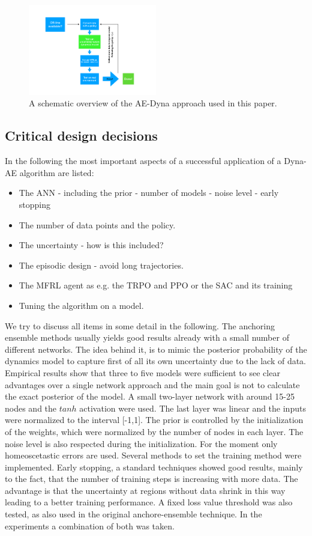 \documentclass[
 reprint,
 amsmath,amssymb,amsfonts,clevref,
 aps,
prstab,
]{revtex4-2}
\begin{document}
\begin{figure}[!h]
	\centering
	\includegraphics*[width=0.5\textwidth]{Figures/MBRL_overview}
	\caption{A schematic overview of the AE-Dyna approach used in this paper.}
	\label{fig:MBRL_overview}
\end{figure}
\subsection{Critical design decisions}
In the following the most important aspects of a successful application of a Dyna-AE algorithm are listed:
\begin{itemize}
	\item The ANN - including the prior - number of models - noise level - early stopping
	\item The number of data points and the policy.
	\item The uncertainty - how is this included?
	\item The episodic design - avoid long trajectories.
	\item The MFRL agent as e.g. the TRPO and PPO or the SAC and its training
	\item Tuning the algorithm on a model.
\end{itemize}
We try to discuss all items in some detail in the following.
The anchoring ensemble methods usually yields good results already with a small number of different networks. The idea behind it, is to mimic the posterior probability of the dynamics model to capture first of all its own uncertainty due to the lack of data. Empirical results show that three to five models were sufficient to see clear advantages over a single network approach and the main goal is not to calculate the exact posterior of the model. A small two-layer network with around 15-25 nodes and the $tanh$ activation were used. The last layer was linear and the inputs were normalized to the interval [-1,1]. The prior is controlled by the initialization of the weights, which were normalized by the number of nodes in each layer. The noise level is also respected during the initialization. For the moment only homeoscetastic errors are used. Several methods to set the training method were implemented. Early stopping, a standard techniques showed good results, mainly to the fact, that the number of training steps is increasing with more data. The advantage is that the uncertainty at regions without data shrink in this way leading to a better training performance. A fixed loss value threshold was also tested, as also used in the original anchore-ensemble technique. In the experiments a combination of both was taken.\\
\end{document}
